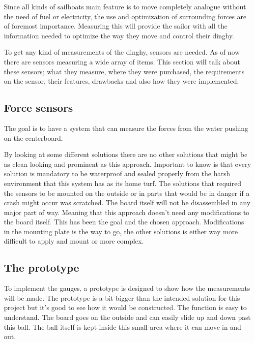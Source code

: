Since all kinds of sailboats main feature is to move completely analogue without the need of fuel or electricity, the use and optimization of surrounding forces are of foremost importance. Measuring this will provide the sailor with all the information needed to optimize the way they move and control their dinghy.

To get any kind of measurements of the dinghy, sensors are needed. As of now there are sensors measuring a wide array of items. This section will talk about these sensors; what they measure, where they were purchased, the requirements on the sensor, their features, drawbacks and also how they were implemented.

\subsection{Force sensors}
The goal is to have a system that can measure the forces from the water pushing on the centerboard. 

By looking at some different solutions there are no other solutions that might be as clean looking and prominent as this approach. Important to know is that every solution is mandatory to be waterproof and sealed properly from the harsh environment that this system has as its home turf. The solutions that required the sensors to be mounted on the outside or in parts that would be in danger if a crash might occur was scratched.  
The board itself will not be disassembled in any major part of way. Meaning that this approach doesn’t need any modifications to the board itself. This has been the goal and the chosen approach. Modifications in the mounting plate is the way to go, the other solutions is either way more difficult to apply and mount or more complex.

\subsection{The prototype}%
To implement the gauges, a prototype is designed to show how the measurements will be made. The prototype is a bit bigger than the intended solution for this project but it's good to see how it would be constructed. The function is easy to understand. The board goes on the outside and can easily slide up and down past this ball.  The ball itself is kept inside this small area where it can move in and out.
 

